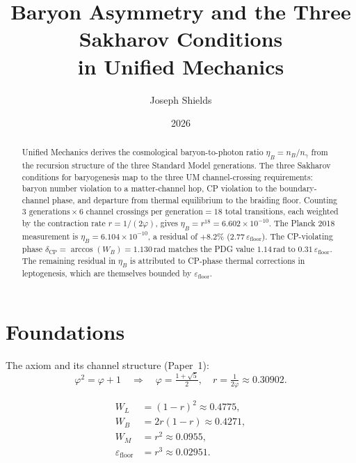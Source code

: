 \documentclass[12pt]{article}
\title{\textbf{Baryon Asymmetry and the Three Sakharov Conditions\\
in Unified Mechanics}}
\author{Joseph Shields}
\date{2026}
\begin{document}
\maketitle

\begin{abstract}
Unified Mechanics derives the cosmological baryon-to-photon ratio
$\eta_B = n_B/n_\gamma$ from the recursion structure of the three
Standard Model generations. The three Sakharov conditions for
baryogenesis map to the three UM channel-crossing requirements: baryon
number violation to a matter-channel hop, CP violation to the
boundary-channel phase, and departure from thermal equilibrium to the
braiding floor. Counting $3\text{ generations} \times 6\text{ channel
crossings per generation} = 18$ total transitions, each weighted by the
contraction rate $r = 1/(2\varphi)$, gives
$\eta_B = r^{18} = 6.602 \times 10^{-10}$.
The Planck 2018 measurement is $\eta_B = 6.104 \times 10^{-10}$,
a residual of $+8.2\%$ ($2.77\,\varepsilon_{\text{floor}}$). The
CP-violating phase $\delta_{\text{CP}} = \arccos(W_B) = 1.130\,\text{rad}$
matches the PDG value $1.14\,\text{rad}$ to $0.31\,\varepsilon_{\text{floor}}$.
The remaining residual in $\eta_B$ is attributed to CP-phase thermal
corrections in leptogenesis, which are themselves bounded by
$\varepsilon_{\text{floor}}$.
\end{abstract}

\section{Foundations}

The axiom and its channel structure (Paper~1):
\begin{equation}
  \varphi^2 = \varphi + 1 \quad\Rightarrow\quad
  \varphi = \tfrac{1+\sqrt{5}}{2},\quad
  r = \tfrac{1}{2\varphi} \approx 0.30902.
  \label{eq:axiom}
\end{equation}

\begin{align}
  W_L &= (1-r)^2 \approx 0.4775, \label{eq:wl}\\
  W_B &= 2r(1-r) \approx 0.4271, \label{eq:wb}\\
  W_M &= r^2     \approx 0.0955, \label{eq:wm}\\
  \varepsilon_{\text{floor}} &= r^3 \approx 0.02951. \label{eq:eps}
\end{align}
\end{document}
